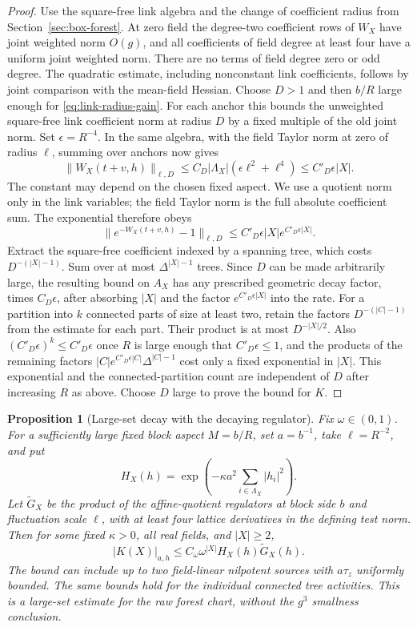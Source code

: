 \documentclass[11pt]{article}
\newtheorem{proposition}{Proposition}[section]
\begin{document}
\begin{proof}
Use the square-free link algebra and the change of coefficient radius
from Section~\ref{sec:box-forest}. At zero field the degree-two
coefficient rows of \(W_X\) have joint weighted norm \(O(g)\),
and all coefficients of field degree at least four have a uniform
joint weighted norm. There are no terms of field degree zero or odd
degree. The quadratic estimate, including nonconstant link
coefficients, follows by joint comparison with the mean-field Hessian.
Choose \(D>1\) and then \(b/R\) large enough for
\eqref{eq:link-radius-gain}.
For each anchor this bounds the unweighted square-free link
coefficient norm at radius \(D\) by a fixed multiple of the
old joint norm. Set \(\epsilon=R^{-4}\). In the same algebra,
with the field Taylor norm at zero of radius \(\ell\), summing over
anchors now gives
\[
 \|W_X(t+v,h)\|_{\ell,D}
    \le C_D|\Lambda_X|(\epsilon\ell^2+\ell^4)
    \le C'_D \epsilon |X| .
\]
The constant may depend on the chosen fixed aspect. We use a
quotient norm only in the link variables; the field Taylor
norm is the full absolute coefficient sum. The exponential
therefore obeys
\[
 \|e^{-W_X(t+v,h)}-1\|_{\ell,D}
      \le C'_D\epsilon |X| e^{C'_D\epsilon |X|}.
\]
Extract the square-free coefficient indexed by a spanning tree,
which costs \(D^{-(|X|-1)}\). Sum over at most
\(\Delta^{|X|-1}\) trees. Since \(D\) can be made arbitrarily
large, the resulting bound on \(A_X\) has any prescribed
geometric decay factor, times \(C_D\epsilon\), after absorbing
\(|X|\) and the factor \(e^{C'_D\epsilon |X|}\) into the rate.
For a partition into \(k\) connected parts of size at least two,
retain the factors \(D^{-(|C|-1)}\) from the estimate for each part.
Their product is at most \(D^{-|X|/2}\). Also
\((C'_D\epsilon)^k\le C'_D\epsilon\) once \(R\) is large enough
that \(C'_D\epsilon\le1\), and the products of the remaining factors
\(|C|e^{C'_D\epsilon|C|}\Delta^{|C|-1}\) cost only a fixed
exponential in \(|X|\). This exponential and the connected-partition
count are independent of \(D\) after increasing \(R\) as above.
Choose \(D\) large to prove the bound for \(K\).
\end{proof}

\begin{proposition}[Large-set decay with the decaying regulator]\label{prop:forest_large}
Fix \(\omega\in(0,1)\). For a sufficiently large fixed block aspect
\(M=b/R\), set \(a=b^{-1}\), take \(\ell=R^{-2}\), and put
\[
 H_X(h)=\exp\left(-\kappa a^2\sum_{i\in\Lambda_X}|h_i|^2\right).
\]
Let \(\widetilde G_X\) be the product of the affine-quotient
regulators at block side \(b\) and fluctuation scale \(\ell\), with
at least four lattice derivatives in the defining test norm. Then
for some fixed \(\kappa>0\), all real fields, and \(|X|\ge2\),
\[
 |K(X)|_{a,h}\le C_\omega\omega^{|X|}H_X(h)\widetilde G_X(h).
\]
The bound can include up to two field-linear nilpotent sources with
\(a\tau_z\) uniformly bounded. The same bounds hold for the individual
connected tree activities. This is a large-set estimate for the
raw forest chart, without the \(g^3\) smallness conclusion.
\end{proposition}
\end{document}
